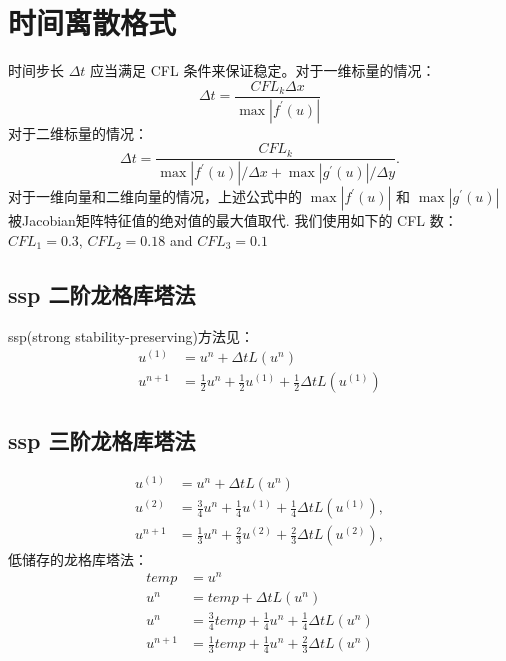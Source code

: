 \documentclass{book}
\begin{document}
\section{时间离散格式}
时间步长 $\Delta t$  应当满足 CFL 条件来保证稳定。对于一维标量的情况：
\begin{equation}
    \Delta t=\frac{C F L_{k} \Delta x}{\max \left|f^{\prime}(u)\right|}
\end{equation}
对于二维标量的情况：
\begin{equation}
    \Delta t=\frac{C F L_{k}}{\max \left|f^{\prime}(u)\right| / \Delta x+\max \left|g^{\prime}(u)\right| / \Delta y} .
\end{equation}
对于一维向量和二维向量的情况，上述公式中的 $\max \left|f^{\prime}(u)\right|$ 和 $\max \left|g^{\prime}(u)\right|$  被Jacobian矩阵特征值的绝对值的最大值取代. 我们使用如下的 CFL 数\cite{RN109}\cite{RN133}\cite{RN148}：  $CFL_1=0.3$, $C F L_{2}=0.18$  and  $C F L_{3}=0.1$

\subsection{ssp 二阶龙格库塔法}
ssp(strong stability-preserving)方法见：\cite{RN96}
\begin{equation}
    \begin{aligned}
        u^{(1)} & =u^{n}+\Delta t L\left(u^{n}\right)                                               \\
        u^{n+1} & =\frac{1}{2} u^{n}+\frac{1}{2} u^{(1)}+\frac{1}{2} \Delta t L\left(u^{(1)}\right)
    \end{aligned}
\end{equation}
\subsection{ssp 三阶龙格库塔法}
\begin{equation}
    \begin{aligned}
        u^{(1)} & =u^{n}+\Delta t L\left(u^{n}\right)                                                \\
        u^{(2)} & =\frac{3}{4} u^{n}+\frac{1}{4} u^{(1)}+\frac{1}{4} \Delta t L\left(u^{(1)}\right), \\
        u^{n+1} & =\frac{1}{3} u^{n}+\frac{2}{3} u^{(2)}+\frac{2}{3} \Delta t L\left(u^{(2)}\right),
    \end{aligned}
\end{equation}
低储存的龙格库塔法：
\begin{equation}
    \begin{aligned}
        temp    & = u^n                                                       \\
        u^n     & = temp +\Delta t L\left(u^{n}\right)                        \\
        u^n     & = \frac{3}{4}temp+\frac{1}{4}u^n+\frac{1}{4}\Delta t L(u^n) \\
        u^{n+1} & = \frac{1}{3}temp+\frac{1}{4}u^n+\frac{2}{3}\Delta t L(u^n)
    \end{aligned}
\end{equation}
\end{document}

